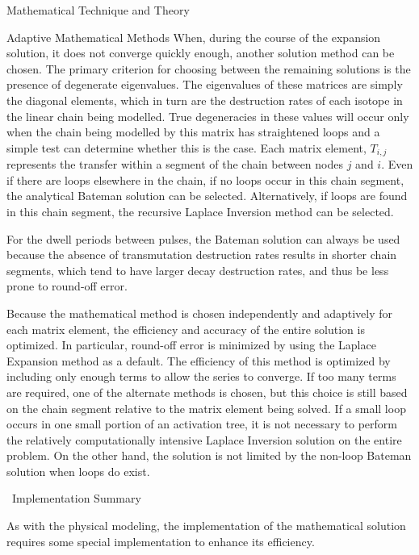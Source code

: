 \begin{chapter}{Mathematical Technique and Theory}
\begin{section}{Adaptive Mathematical Methods\label{sec:math.adaptive}}
  When, during the course of the expansion solution, it does not
  converge quickly enough, another solution method can be chosen.  The
  primary criterion for choosing between the remaining solutions is
  the presence of degenerate eigenvalues.  The eigenvalues of these
  matrices are simply the diagonal elements, which in turn are the
  destruction rates of each isotope in the linear chain being
  modelled.  True degeneracies in these values will occur only when
  the chain being modelled by this matrix has straightened loops and a
  simple test can determine whether this is the case.  Each matrix
  element, $T_{i,j}$ represents the transfer within a segment of the
  chain between nodes $j$ and $i$.  Even if there are loops elsewhere
  in the chain, if no loops occur in this chain segment, the
  analytical Bateman solution can be selected.  Alternatively, if
  loops are found in this chain segment, the recursive Laplace
  Inversion method can be selected.
  
 For the dwell periods between pulses, the Bateman solution can
  always be used because the absence of transmutation destruction
  rates results in shorter chain segments, which tend to have larger
  decay destruction rates, and thus be less prone to round-off error.
  
  Because the mathematical method is chosen independently and
  adaptively for each matrix element, the efficiency and accuracy of
  the entire solution is optimized.  In particular, round-off error is
  minimized by using the Laplace Expansion method as a default.  The
  efficiency of this method is optimized by including only enough
  terms to allow the series to converge.  If too many terms are
  required, one of the alternate methods is chosen, but this choice is
  still based on the chain segment relative to the matrix element
  being solved.  If a small loop occurs in one small portion of an
  activation tree, it is not necessary to perform the relatively
  computationally intensive Laplace Inversion solution on the entire
  problem.  On the other hand, the solution is not limited by the
  non-loop Bateman solution when loops do exist.

\end{section}

\begin{section}{\ALARA\ Implementation Summary}\label{sec:math.implement}
  
  As with the physical modeling, the implementation of the
  mathematical solution requires some special implementation to
  enhance its efficiency.
  

\end{section}
\end{chapter}
